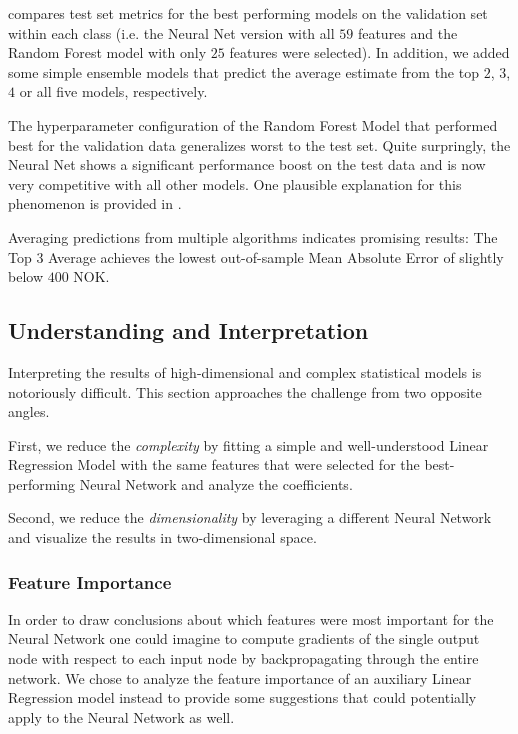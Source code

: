  compares test set metrics for the best performing models on the validation set within each class (i.e. the Neural Net version with all $59$ features and the Random Forest model with only $25$ features were selected).
In addition, we added some simple ensemble models that predict the average estimate from the top $2$, $3$, $4$ or all five models, respectively.

The hyperparameter configuration of the Random Forest Model that performed best for the validation data generalizes worst to the test set.
Quite surpringly, the Neural Net shows a significant performance boost on the test data and is now very competitive with all other models.
One plausible explanation for this phenomenon is provided in .

Averaging predictions from multiple algorithms indicates promising results:
The Top $3$ Average achieves the lowest out-of-sample Mean Absolute Error of slightly below $400$ NOK.




\subsection{Understanding and Interpretation}

Interpreting the results of high-dimensional and complex statistical models is notoriously difficult.
This section approaches the challenge from two opposite angles.

First, we reduce the \emph{complexity} by fitting a simple and well-understood Linear Regression Model with the same features that were selected for the best-performing Neural Network and analyze the coefficients.

Second, we reduce the \emph{dimensionality} by leveraging a different Neural Network and visualize the results in two-dimensional space.

\subsubsection{Feature Importance}

In order to draw conclusions about which features were most important for the Neural Network one could imagine to compute gradients of the single output node with respect to each input node by backpropagating through the entire network.
We chose to analyze the feature importance of an auxiliary Linear Regression model instead to provide some suggestions that could potentially apply to the Neural Network as well.

